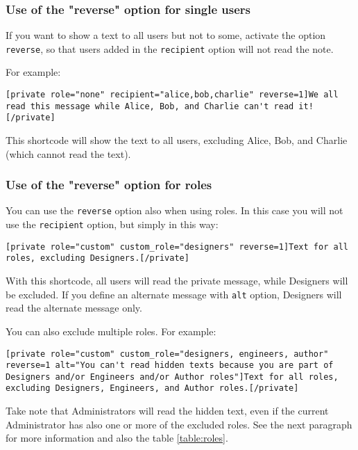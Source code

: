 \documentclass[
	titlepage,
	headinclude,
	abstract=on,
	paper=a4,
	fontsize=11pt,
]{scrartcl}
\begin{document}
\subsubsection{Use of the "reverse" option for single users}

If you want to show a text to all users but not to some, activate the option \verb+reverse+, so that users added in the \verb+recipient+ option will not read the note.

For example:

\begin{lstlisting}
[private role="none" recipient="alice,bob,charlie" reverse=1]We all read this message while Alice, Bob, and Charlie can't read it![/private]
\end{lstlisting}

This shortcode will show the text to all users, excluding Alice, Bob, and Charlie (which cannot read the text).

\subsubsection{Use of the "reverse" option for roles}

You can use the \verb+reverse+ option also when using roles. In this case you will not use the \verb+recipient+ option, but simply in this way:

\begin{lstlisting}
[private role="custom" custom_role="designers" reverse=1]Text for all roles, excluding Designers.[/private]
\end{lstlisting}

With this shortcode, all users will read the private message, while Designers will be excluded. If you define an alternate message with \verb+alt+ option, Designers will read the alternate message only.

You can also exclude multiple roles. For example:

\begin{lstlisting}
[private role="custom" custom_role="designers, engineers, author" reverse=1 alt="You can't read hidden texts because you are part of Designers and/or Engineers and/or Author roles"]Text for all roles, excluding Designers, Engineers, and Author roles.[/private]
\end{lstlisting}

Take note that Administrators will read the hidden text, even if the current Administrator has also one or more of the excluded roles. See the next paragraph for more information and also the table \ref{table:roles}.
\end{document}
